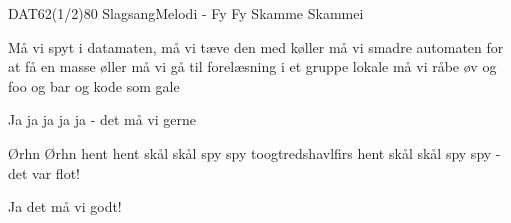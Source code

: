 \begin{sang}{DAT62(1/2)80 Slagsang}{Melodi - Fy Fy Skamme Skammei}
\begin{vers}
Må vi spyt i datamaten, 
må vi tæve den med køller
må vi smadre automaten
for at få en masse øller
må vi gå til forelæsning
i et gruppe lokale 
må vi råbe øv og foo og bar
og kode som gale
\end{vers}
\begin{vers}
Ja ja ja ja ja - det må vi gerne
\end{vers}
\begin{vers}
Ørhn Ørhn hent hent skål skål spy spy
toogtredshavlfirs hent skål skål spy spy
- det var flot!
\end{vers}
\begin{vers}
Ja det må vi godt!
\end{vers}
\laps
\end{sang}
